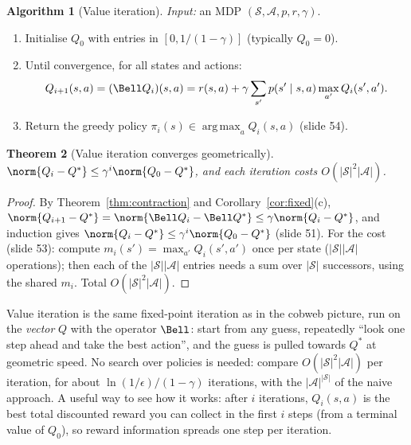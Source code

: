 \documentclass[11pt,a4paper]{article}
\DeclareMathOperator*{\argmax}{arg\,max}
\newcommand{\cS}{\mathcal{S}}
\newcommand{\cA}{\mathcal{A}}
\theoremstyle{plain}
\newtheorem{theorem}{Theorem}[section]
\theoremstyle{definition}
\newtheorem{algorithm}[theorem]{Algorithm}
\theoremstyle{remark}
\begin{document}
\begin{algorithm}[Value iteration]\label{alg:vi}
\emph{Input:} an MDP $(\cS,\cA,p,r,\gamma)$.\par
\begin{enumerate}[label=\arabic*.,leftmargin=*]
  \item Initialise $Q_0$ with entries in $[0,1/(1-\gamma)]$ (typically $Q_0=0$).
  \item Until convergence, for all states and actions:
  \[
  Q_{i+1}(s,a)=(\Bell Q_i)(s,a)=r(s,a)+\gamma\sum_{s'}p(s'\mid s,a)\max_{a'}Q_i(s',a').
  \]
  \item Return the greedy policy $\pi_i(s)\in\argmax_aQ_i(s,a)$ (slide 54).
\end{enumerate}
\end{algorithm}

\begin{theorem}[Value iteration converges geometrically]\label{thm:vi}
$\norm{Q_i-Q^*}\le\gamma^i\norm{Q_0-Q^*}$, and each iteration costs $O(|\cS|^2|\cA|)$.
\end{theorem}
\begin{proof}
By Theorem~\ref{thm:contraction} and Corollary~\ref{cor:fixed}(c), $\norm{Q_{i+1}-Q^*}=\norm{\Bell Q_i-\Bell Q^*}\le\gamma\norm{Q_i-Q^*}$, and induction gives $\norm{Q_i-Q^*}\le\gamma^i\norm{Q_0-Q^*}$ (slide 51). For the cost (slide 53): compute $m_i(s')=\max_{a'}Q_i(s',a')$ once per state ($|\cS||\cA|$ operations); then each of the $|\cS||\cA|$ entries needs a sum over $|\cS|$ successors, using the shared $m_i$. Total $O(|\cS|^2|\cA|)$.
\end{proof}

\begin{intuition}
Value iteration is the same fixed-point iteration as in the cobweb picture, run on the \emph{vector} $Q$ with the operator $\Bell$: start from any guess, repeatedly ``look one step ahead and take the best action'', and the guess is pulled towards $Q^*$ at geometric speed. No search over policies is needed: compare $O(|\cS|^2|\cA|)$ per iteration, for about $\ln(1/\epsilon)/(1-\gamma)$ iterations, with the $|\cA|^{|\cS|}$ of the naive approach. A useful way to see how it works: after $i$ iterations, $Q_i(s,a)$ is the best total discounted reward you can collect in the first $i$ steps (from a terminal value of $Q_0$), so reward information spreads one step per iteration.
\end{intuition}
\end{document}
